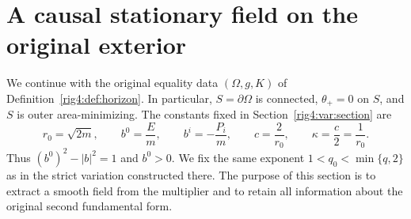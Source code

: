 \section{A causal stationary field on the original exterior}
\label{rig4:adj:section}

We continue with the original equality data $(\Omega,g,K)$ of
Definition~\ref{rig4:def:horizon}.  In particular, $S=\partial\Omega$ is connected,
$\theta_+=0$ on $S$, and $S$ is outer area-minimizing.  The constants fixed in
Section~\ref{rig4:var:section} are
\[
 r_0=\sqrt{2m},\qquad b^0=\frac E m,\qquad b^i=-\frac{P_i}{m},
 \qquad c=\frac2{r_0},\qquad \kappa=\frac c2=\frac1{r_0}.
\]
Thus $(b^0)^2-|b|^2=1$ and $b^0>0$.  We fix the same exponent
$1<q_0<\min\{q,2\}$ as in the strict variation constructed there.
The purpose of this section is to extract a smooth field from the multiplier
and to retain all information about the original second fundamental form.

